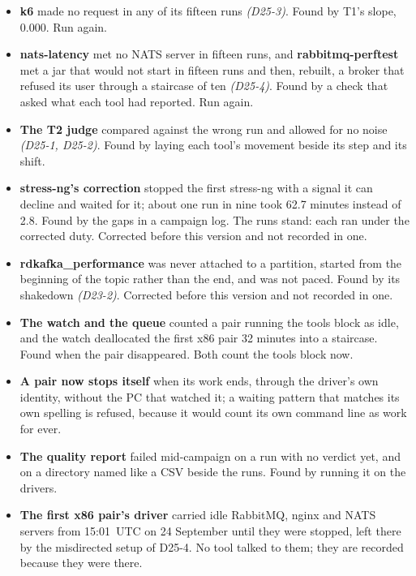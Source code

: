 \documentclass[11pt]{article}
\newcommand{\gl}[1]{{\color{soft}\itshape\small (#1)}}
\begin{document}
\begin{itemize}
  \item \textbf{k6} made no request in any of its fifteen runs \gl{D25-3}. Found by T1's slope,
        0.000. Run again.
  \item \textbf{nats-latency} met no NATS server in fifteen runs, and \textbf{rabbitmq-perftest}
        met a jar that would not start in fifteen runs and then, rebuilt, a broker that refused
        its user through a staircase of ten \gl{D25-4}. Found by a check that asked what each
        tool had reported. Run again.
  \item \textbf{The T2 judge} compared against the wrong run and allowed for no noise
        \gl{D25-1, D25-2}. Found by laying each tool's movement beside its step and its shift.
  \item \textbf{stress-ng's correction} stopped the first stress-ng with a signal it can decline
        and waited for it; about one run in nine took 62.7 minutes instead of 2.8. Found by the
        gaps in a campaign log. The runs stand: each ran under the corrected duty. Corrected
        before this version and not recorded in one.
  \item \textbf{rdkafka\_performance} was never attached to a partition, started from the
        beginning of the topic rather than the end, and was not paced. Found by its shakedown
        \gl{D23-2}. Corrected before this version and not recorded in one.
  \item \textbf{The watch and the queue} counted a pair running the tools block as idle, and the
        watch deallocated the first x86 pair 32 minutes into a staircase. Found when the pair
        disappeared. Both count the tools block now.
  \item \textbf{A pair now stops itself} when its work ends, through the driver's own identity,
        without the PC that watched it; a waiting pattern that matches its own spelling is
        refused, because it would count its own command line as work for ever.
  \item \textbf{The quality report} failed mid-campaign on a run with no verdict yet, and on a
        directory named like a CSV beside the runs. Found by running it on the drivers.
  \item \textbf{The first x86 pair's driver} carried idle RabbitMQ, nginx and NATS servers from
        15:01~UTC on 24 September until they were stopped, left there by the misdirected setup
        of D25-4. No tool talked to them; they are recorded because they were there.
\end{itemize}
\end{document}
